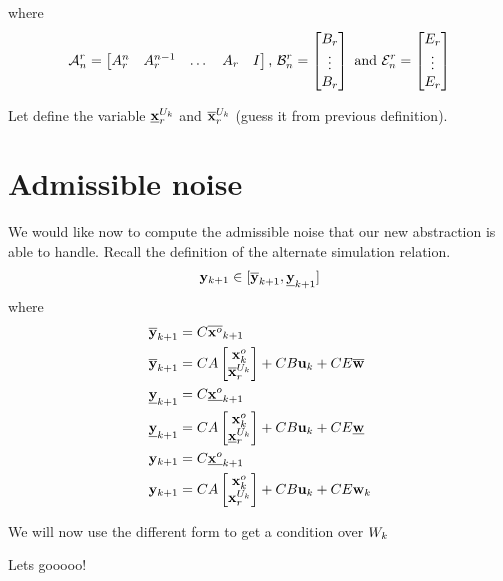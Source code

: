 \documentclass{article}
\begin{document}
where
$$
\mathcal{A}^r_n = 
\begin{bmatrix}
A_r^n & A_r^{n-1} &\dots & A_r & I
\end{bmatrix}
\textrm{, }
\mathcal{B}^r_n = 
\begin{bmatrix}
B_r\\
\vdots\\
B_r
\end{bmatrix}
\textrm{ and }
\mathcal{E}^r_n = 
\begin{bmatrix}
E_r\\
\vdots\\
E_r
\end{bmatrix}
$$

\newcommand{\xuki}{\minf{\x}^{U_k}_r}
\newcommand{\xuks}{\msup{\x}^{U_k}_r}
\newcommand{\xuk}{\x^{U_k}_r}
Let define the variable $\xuki$ and $\xuks$ (guess it from previous definition).

\section{Admissible noise}
We would like now to compute the admissible noise that our new abstraction is able to handle.
\newcommand{\sykn}{\msup{\y}_{k+1}}%
\newcommand{\iykn}{\minf{\y}_{k+1}}%
Recall the definition of the alternate simulation relation.
$$
\ykn \in [\sykn,\iykn]
$$
where 
\begin{align*}
\sykn &= C \msup{\xo}_{k+1}\\
\sykn &= C A 
\begin{bmatrix}
\xo_{k} \\
\xuks
\end{bmatrix}
+ C B \uk + C E \msup{\w}
\\
\iykn &= C \minf{\xo}_{k+1}\\
\iykn &= C A 
\begin{bmatrix}
\xo_{k} \\
\xuki
\end{bmatrix}
+ C B \uk + C E \minf{\w}
\\
\ykn &= C \minf{\xo}_{k+1}\\
\ykn &= C A 
\begin{bmatrix}
\xo_{k} \\
\xuk
\end{bmatrix}
+ C B \uk + C E \wk
\end{align*}

We will now use the different form to get a condition over $W_k$

Lets gooooo!
\end{document}
